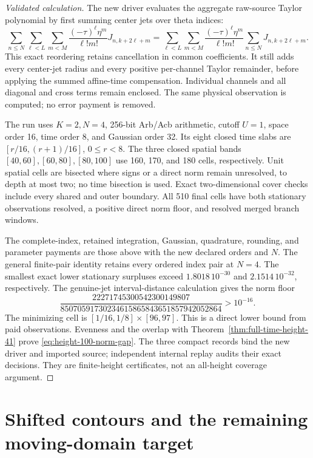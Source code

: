 \documentclass[11pt]{article}
\numberwithin{equation}{section}
\theoremstyle{definition}
\theoremstyle{remark}
\begin{document}
\begin{proof}[Validated calculation]
The new driver evaluates the aggregate raw-source Taylor polynomial by
first summing center jets over theta indices:
\[
 \sum_{n\le N}\sum_{\ell<L}\sum_{m<M}
 \frac{(-\tau)^\ell\eta^m}{\ell!m!}J_{n,k+2\ell+m}
 =\sum_{\ell<L}\sum_{m<M}\frac{(-\tau)^\ell\eta^m}{\ell!m!}
 \sum_{n\le N}J_{n,k+2\ell+m}.
\]
This exact reordering retains cancellation in common coefficients.
It still adds every center-jet radius and every positive per-channel
Taylor remainder, before applying the summed affine-time compensation.
Individual channels and all diagonal and cross terms remain enclosed.
The same physical observation is computed; no error payment is removed.

The run uses \(K=2,N=4\), 256-bit Arb/Acb arithmetic, cutoff \(U=1\),
space order 16, time order 8, and Gaussian order 32. Its eight closed
time slabs are \([r/16,(r+1)/16]\), \(0\le r<8\). The three closed
spatial bands \([40,60],[60,80],[80,100]\) use 160, 170, and 180 cells,
respectively. Unit spatial cells are bisected where signs or a direct
norm remain unresolved, to depth at most two; no time bisection is used.
Exact two-dimensional cover checks include every shared and outer
boundary. All 510 final cells have both stationary observations resolved,
a positive direct norm floor, and resolved merged branch windows.

The complete-index, retained integration, Gaussian, quadrature, rounding,
and parameter payments are those above with the new declared orders
and \(N\). The general finite-pair identity retains every ordered
index pair at \(N=4\). The smallest exact lower stationary surpluses
exceed \(1.8018\,10^{-30}\) and \(2.1514\,10^{-32}\), respectively.
The genuine-jet interval-distance calculation gives the norm floor
\[
 \frac{22271745300542300149807}
 {85070591730234615865843651857942052864}>10^{-16}.
\]
The minimizing cell is \([1/16,1/8]\times[96,97]\). This is a direct
lower bound from paid observations. Evenness and the overlap with
Theorem~\ref{thm:full-time-height-41} prove
\eqref{eq:height-100-norm-gap}.
The three compact records bind the new driver and imported source;
independent internal replay audits their exact decisions. They are
finite-height certificates, not an all-height coverage argument.
\end{proof}

\section{Shifted contours and the remaining moving-domain target}
\label{sec:shifted-contours}
\end{document}
